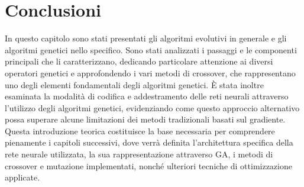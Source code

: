 \section{Conclusioni}
In questo capitolo sono stati presentati gli algoritmi evolutivi in generale e gli algoritmi genetici nello specifico. Sono stati analizzati i passaggi e le componenti principali che li caratterizzano, dedicando particolare attenzione ai diversi operatori genetici e approfondendo i vari metodi di crossover, che rappresentano uno degli elementi fondamentali degli algoritmi genetici.
È stata inoltre esaminata la modalità di codifica e addestramento delle reti neurali attraverso l'utilizzo degli algoritmi genetici, evidenziando come questo approccio alternativo possa superare alcune limitazioni dei metodi tradizionali basati sul gradiente. Questa introduzione teorica costituisce la base necessaria per comprendere pienamente i capitoli successivi, dove verrà definita l'architettura specifica della rete neurale utilizzata, la sua rappresentazione attraverso GA, i metodi di crossover e mutazione implementati, nonché ulteriori tecniche di ottimizzazione applicate.

